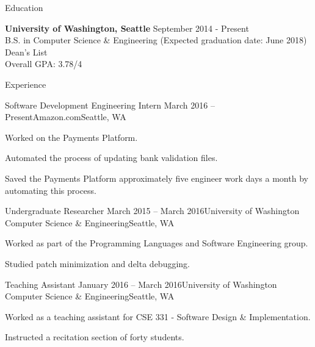 \documentclass{resume} %
\begin{document}

\begin{rSection}{Education}

  {\bf University of Washington, Seattle} \hfill {September 2014 - Present} \\
  B.S. in Computer Science \& Engineering (Expected graduation date: June 2018) \\
  Dean's List \\
  Overall GPA: 3.78/4

\end{rSection}


\begin{rSection}{Experience}

  \begin{rSubsection}{Software Development Engineering Intern}
    {March 2016 -- Present}{Amazon.com}{Seattle, WA}
  \item Worked on the Payments Platform.
  \item Automated the process of updating bank validation files.
  \item Saved the Payments Platform approximately five engineer work days a month by automating this process.
  \end{rSubsection}

  \begin{rSubsection}{Undergraduate Researcher}
    {March 2015 -- March 2016}{University of Washington Computer Science \& Engineering}{Seattle, WA}
  \item Worked as part of the Programming Languages and Software Engineering
    group.
  \item Studied patch minimization and delta debugging.
  \end{rSubsection}

  \begin{rSubsection}{Teaching Assistant}
    {January 2016 -- March 2016}{University of Washington Computer Science \& Engineering}{Seattle, WA}
  \item Worked as a teaching assistant for CSE 331 - Software Design \& Implementation.
  \item Instructed a recitation section of forty students.
  \end{rSubsection}

\end{rSection}
\end{document}
